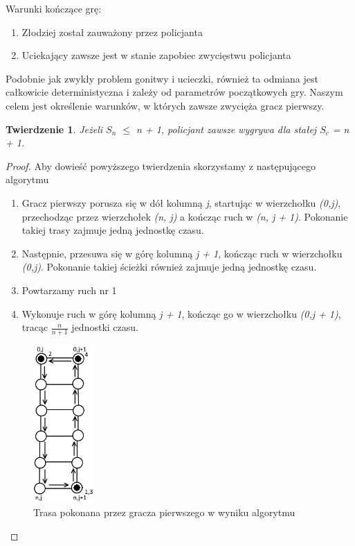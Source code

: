 \documentclass[brudnopis]{xmgr}
\newtheorem{Twierdzenie}{Twierdzenie} \theoremstyle{definition}
\begin{document}
Warunki kończące grę:
\begin{enumerate}
  \item Złodziej został zauważony przez policjanta
  \item Uciekający zawsze jest w stanie zapobiec zwycięstwu policjanta
\end{enumerate}

Podobnie jak zwykły problem gonitwy i ucieczki, również ta odmiana jest całkowicie deterministyczna i zależy od parametrów początkowych gry. Naszym celem jest określenie warunków, w których zawsze zwycięża gracz pierwszy. 

\begin{Twierdzenie}
	Jeżeli $S_n$ $\le$ n + 1, policjant zawsze wygrywa dla stałej $S_c$ = n + 1.
\end{Twierdzenie}
\begin{proof}
	Aby dowieść powyższego twierdzenia skorzystamy z następującego algorytmu
	\begin{enumerate}
		\item Gracz pierwszy porusza się w dół kolumną \textit{j}, startując w wierzchołku \textit{(0,j)}, przechodząc przez wierzchołek \textit{(n, j)} a kończąc ruch w \textit{(n, j + 1)}. Pokonanie takiej trasy zajmuje jedną jednostkę czasu.
		\item Następnie, przesuwa się w górę kolumną \textit{j + 1}, kończąc ruch w wierzchołku \textit{(0,j)}. Pokonanie takiej ścieżki również zajmuje jedną jednostkę czasu.
		\item Powtarzamy ruch nr 1
		\item Wykonuje ruch w górę kolumną \textit{j + 1}, kończąc go w wierzchołku \textit{(0,j + 1)}, tracąc $\frac{n}{n+1}$ jednostki czasu.
	\end{enumerate}
	\begin{figure}[ht!]
	  \centering
	  \includegraphics[height=6cm]{rysunki/schemat_ruchu.png}
	  \caption{Trasa pokonana przez gracza pierwszego w wyniku algorytmu}
	\end{figure} 


\end{proof}
\end{document}
